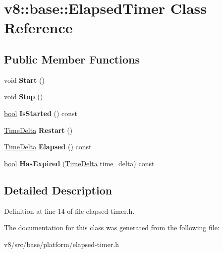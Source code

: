 \hypertarget{classv8_1_1base_1_1ElapsedTimer}{}\section{v8\+:\+:base\+:\+:Elapsed\+Timer Class Reference}
\label{classv8_1_1base_1_1ElapsedTimer}
\subsection*{Public Member Functions}
\begin{DoxyCompactItemize}
\item 
\mbox{\label{classv8_1_1base_1_1ElapsedTimer_a451f6e2636acacce40e1dad13fbf7a20}} 
void {\bfseries Start} ()
\item 
\mbox{\label{classv8_1_1base_1_1ElapsedTimer_ae6991b8f7a97d66db8a05fc4b36b6c98}} 
void {\bfseries Stop} ()
\item 
\mbox{\label{classv8_1_1base_1_1ElapsedTimer_a14e1e398cec7a771e1dbb5a44734258d}} 
\mbox{\hyperlink{classbool}{bool}} {\bfseries Is\+Started} () const
\item 
\mbox{\label{classv8_1_1base_1_1ElapsedTimer_a99ca2e2048926dab4730808c8c11c48b}} 
\mbox{\hyperlink{classv8_1_1base_1_1TimeDelta}{Time\+Delta}} {\bfseries Restart} ()
\item 
\mbox{\label{classv8_1_1base_1_1ElapsedTimer_a322a9d18bf9a1a89a232fc014639207b}} 
\mbox{\hyperlink{classv8_1_1base_1_1TimeDelta}{Time\+Delta}} {\bfseries Elapsed} () const
\item 
\mbox{\label{classv8_1_1base_1_1ElapsedTimer_a195b758dce27adc7b0102805e83d0041}} 
\mbox{\hyperlink{classbool}{bool}} {\bfseries Has\+Expired} (\mbox{\hyperlink{classv8_1_1base_1_1TimeDelta}{Time\+Delta}} time\+\_\+delta) const
\end{DoxyCompactItemize}


\subsection{Detailed Description}


Definition at line 14 of file elapsed-\/timer.\+h.



The documentation for this class was generated from the following file\+:\begin{DoxyCompactItemize}
\item 
v8/src/base/platform/elapsed-\/timer.\+h\end{DoxyCompactItemize}
